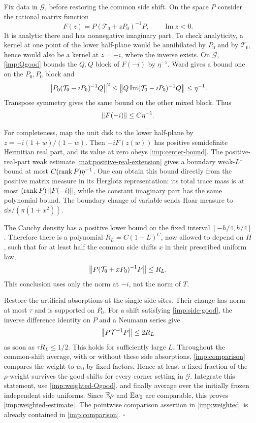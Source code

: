 Fix data in $\mathcal G$, before restoring the common side shift. On the
space $P$ consider the rational matrix function
\[
 F(z)=P(\mathcal T_0+zP_0)^{-1}P,
 \qquad\operatorname{Im}z<0.
\]
It is analytic there and has nonnegative imaginary part. To check
analyticity, a kernel at one point of the lower half-plane would be
annihilated by $P_0$ and by $\mathcal T_0$, hence would also be a kernel
at $z=-i$, where the inverse exists. On $\mathcal G$,
\cref{imp:Qgood} bounds the $Q,Q$ block of $F(-i)$ by $\eta^{-1}$.
Ward gives a bound one on the $P_0,P_0$ block and
\[
 \left\lVert P_0(\mathcal T_0-iP_0)^{-1}Q\right\rVert^2
 \le\left\lVert Q\operatorname{Im}(\mathcal T_0-iP_0)^{-1}Q\right\rVert
 \le\eta^{-1}.
\]
Transpose symmetry gives the same bound on the other mixed block. Thus
\begin{equation}
 \left\lVert F(-i)\right\rVert\le C\eta^{-1}.
 \label{imp:center-bound}
\end{equation}

For completeness, map the unit disk to the lower half-plane by
$z=-i(1+w)/(1-w)$. Then $-iF(z(w))$ has positive semidefinite Hermitian
real part, and its value at zero obeys \cref{imp:center-bound}. The
positive-real-part weak estimate \cref{mat:positive-real-extension} gives
a boundary weak-$L^1$ bound at most
$C(\operatorname{rank} P)\eta^{-1}$. One can obtain this bound directly from the
positive matrix measure in its Herglotz representation: its total trace
mass is at most $(\operatorname{rank} P)\left\lVert F(-i)\right\rVert$, while the constant imaginary
part has the same polynomial bound. The boundary change of variable
sends Haar measure to $\dd x/(\pi(1+x^2))$.

The Cauchy density has a positive lower bound on the fixed interval
$[-h/4,h/4]$. Therefore there is a polynomial
$R_L=C(1+L)^C$, now allowed to depend on $H$, such that for at least
half the common side shifts $x$ in their prescribed uniform law,
\begin{equation}
 \left\lVert P(\mathcal T_0+xP_0)^{-1}P\right\rVert\le R_L.
 \label{imp:side-good}
\end{equation}
This conclusion uses only the norm at $-i$, not the norm of $T$.

Restore the artificial absorptions at the single side sites. Their
change has norm at most $\tau$ and is supported on $P_0$. For a shift
satisfying \cref{imp:side-good}, the inverse difference identity on $P$
and a Neumann series give
\[
 \left\lVert P\mathcal T^{-1}P\right\rVert\le2R_L
\]
as soon as $\tau R_L\le1/2$. This holds for sufficiently large $L$.
Throughout the common-shift average, with or without these side
absorptions, \cref{imp:comparison} compares the weight to $w_0$ by
fixed factors. Hence at least a fixed fraction of the $\rho$-weight
survives the good shifts for every corner setting in $\mathcal G$.
Integrate this statement, use \cref{imp:weighted-Qgood}, and finally
average over the initially frozen independent side uniforms. Since
$\mathbb E\rho$ and $\mathbb E w_0$ are comparable, this proves
\cref{imp:weighted-estimate}. The pointwise comparison assertion in
\cref{imp:weighted} is already contained in \cref{imp:comparison}.
\hfill$\square$

